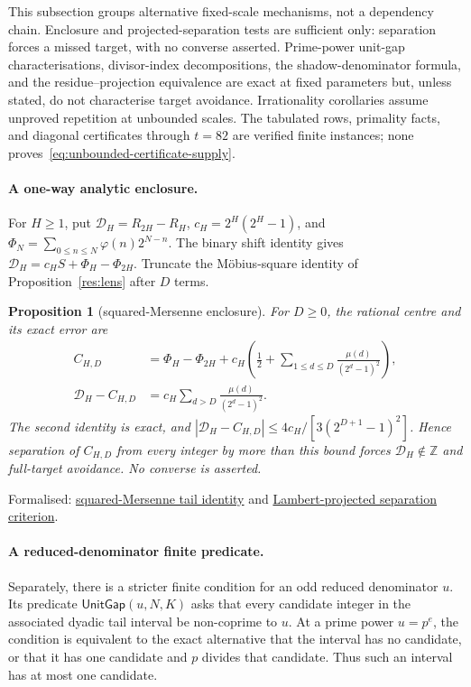 \documentclass[11pt]{article}
\newcommand{\commit}{bb4e24651b37cd096d3749ef299c3317930b3a3b}
\newcommand{\repobase}{https://github.com/wcook04/plectis-lean-erdos249-257/blob/\commit}
\newcommand{\PK}{Erdos249257}
\newcommand{\lword}[4]{\href{\repobase/\PK/#1\#L#2}{#4}}
\newtheorem{proposition}[theorem]{Proposition}
\theoremstyle{definition}
\theoremstyle{remark}
\newcommand{\Z}{\mathbb{Z}}
\newcommand{\ph}{\varphi}
\begin{document}
{This subsection groups alternative fixed-scale mechanisms, not a dependency
chain.  Enclosure and projected-separation tests are sufficient only:
separation forces a missed target, with no converse asserted.  Prime-power
unit-gap characterisations, divisor-index decompositions, the shadow-denominator
formula, and the residue--projection equivalence are exact at fixed parameters
but, unless stated, do not characterise target avoidance.  Irrationality
corollaries assume unproved repetition at unbounded scales.  The tabulated
rows, primality facts, and diagonal certificates through $t=82$ are verified
finite instances; none proves~\eqref{eq:unbounded-certificate-supply}.

\paragraph{A one-way analytic enclosure.}
For $H\ge1$, put $\mathcal D_H=R_{2H}-R_H$,
$c_H=2^H(2^H-1)$, and
$\Phi_N=\sum_{0\le n\le N}\ph(n)2^{N-n}$.  The binary shift identity gives
$\mathcal D_H=c_HS+\Phi_H-\Phi_{2H}$.  Truncate the M\"obius-square identity
of Proposition~\ref{res:lens} after $D$ terms.

\begin{proposition}[squared-Mersenne enclosure]\label{res:squareenclosure}
For $D\ge0$, the rational centre and its exact error are
\[
 \begin{aligned}
 C_{H,D}&=\Phi_H-\Phi_{2H}
   +c_H\left(\frac12+\sum_{1\le d\le D}
      \frac{\mu(d)}{(2^d-1)^2}\right),\\
 \mathcal D_H-C_{H,D}
   &=c_H\sum_{d>D}\frac{\mu(d)}{(2^d-1)^2}.
 \end{aligned}
\]
The second identity is exact, and
$|\mathcal D_H-C_{H,D}|\le4c_H/[3(2^{D+1}-1)^2]$.  Hence separation of
$C_{H,D}$ from every integer by more than this bound forces
$\mathcal D_H\notin\Z$ and full-target avoidance.  No converse is asserted.
\end{proposition}
\noindent Formalised:
\lword{SquaredMersenneDiagonalEnclosure.lean}{138}{scaleDiagonalTailDifference_sub_lambertProjectedDiagonal}{squared-Mersenne tail identity}
and
\lword{SquaredMersenneDiagonalEnclosure.lean}{426}{scaleFullTarget_miss_of_lambert_projected_separation}{Lambert-projected separation criterion}.

\paragraph{A reduced-denominator finite predicate.}  Separately, there is a
stricter finite condition for an odd reduced denominator
$u$.  Its predicate $\mathsf{UnitGap}(u,N,K)$ asks that
every candidate integer in the associated dyadic tail interval be non-coprime
to $u$.  At a prime power $u=p^e$, the condition is equivalent to the exact
alternative that the interval has no candidate, or that it has one candidate
and $p$ divides that candidate.  Thus such an interval has at most one
candidate.

}
\end{document}
